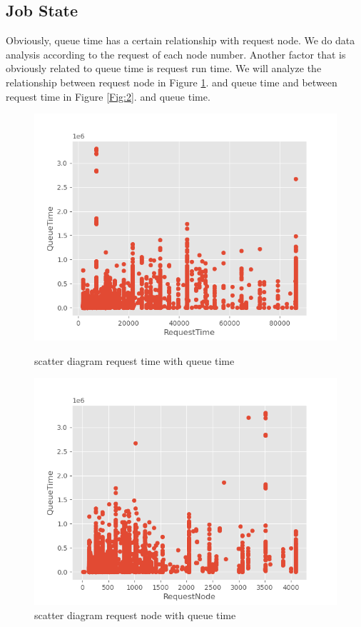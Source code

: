 \documentclass[conference,compsoc]{IEEEtran}
\begin{document}
\subsection{Job State}
Obviously, queue time has a certain relationship with request node. We do data analysis according to the request of each node number. Another factor that is obviously related to queue time is request run time. We will analyze the relationship between request node in Figure \ref{Fig:3}. and queue time and between request time in Figure \ref{Fig:2}. and queue time.
\begin{figure}[htbp]
	\begin{minipage}[t]{0.45\linewidth}
		\includegraphics[width=\linewidth]{requesttimequeue.png} 
		\caption{scatter diagram request time with queue time} 
		\label{Fig:2}
	\end{minipage}%
	\hfill%
	\begin{minipage}[t]{0.45\linewidth}
		\includegraphics[width=\linewidth]{nodequeue.png}
		\caption{scatter diagram request node with queue time}
		\label{Fig:3}
	\end{minipage} 
\end{figure}
\end{document}
